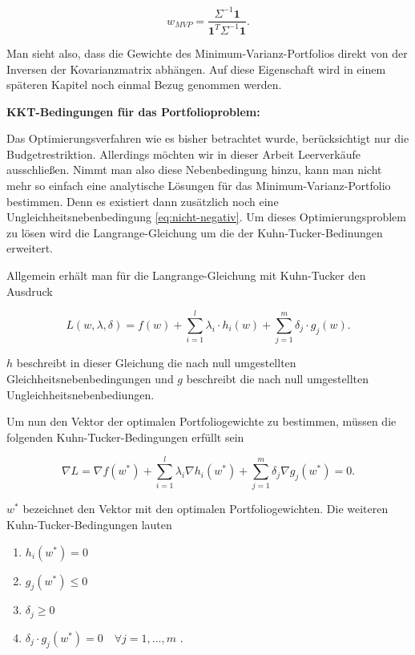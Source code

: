\documentclass[parskip=half]{scrartcl}
\begin{document}
	\begin{equation}
		w_{MVP} = \frac{\Sigma^{-1}\mathbf{1}}{\mathbf{1}^T \Sigma^{-1} \mathbf{1}} . \label{eq:w_mvp}
	\end{equation}
	
	
	Man sieht also, dass die Gewichte des Minimum-Varianz-Portfolios direkt von der Inversen der Kovarianzmatrix abhängen. Auf diese Eigenschaft wird in einem späteren Kapitel noch einmal Bezug genommen werden.
	
	\textbf{KKT-Bedingungen für das Portfolioproblem:}	
	
	Das Optimierungsverfahren wie es bisher betrachtet wurde, berücksichtigt nur die Budgetrestriktion. Allerdings möchten wir in dieser Arbeit Leerverkäufe ausschließen. Nimmt man also diese Nebenbedingung hinzu, kann man nicht mehr so einfach eine analytische Lösungen für das Minimum-Varianz-Portfolio bestimmen. Denn es existiert dann zusätzlich noch eine Ungleichheitsnebenbedingung \eqref{eq:nicht-negativ}. Um dieses Optimierungsproblem zu lösen wird die Langrange-Gleichung um die der Kuhn-Tucker-Bedinungen erweitert.
	
	Allgemein erhält man für die Langrange-Gleichung mit Kuhn-Tucker den Ausdruck \parencite[260]{Nickel}
	
	\begin{equation}
		L(w, \lambda, \delta) = f(w) + \sum_{i=1}^{l} \lambda_i \cdot h_i(w) + \sum_{j=1}^{m} \delta_j \cdot g_j(w) . \label{eq:langrange_kkt}
	\end{equation}
	
	$h$ beschreibt in dieser Gleichung die nach null umgestellten Gleichheitsnebenbedingungen und $g$ beschreibt die nach null umgestellten Ungleichheitsnebenbediungen.
	
	
	Um nun den Vektor der optimalen Portfoliogewichte zu bestimmen, müssen die folgenden Kuhn-Tucker-Bedingungen erfüllt sein \parencite[260]{Nickel}
	
	\begin{equation}
		\nabla L = \nabla f(w^*) + \sum_{i=1}^{l} \lambda_i \nabla h_i(w^*) + \sum_{j=1}^{m} \delta_j \nabla g_j (w^*) = 0 .
	\end{equation}
	
	$w^*$ bezeichnet den Vektor mit den optimalen Portfoliogewichten. Die weiteren Kuhn-Tucker-Bedingungen lauten
	
	\begin{enumerate}
		\item $h_i(w^*) = 0$
		\item $g_j(w^*) \leq 0$
		\item $\delta_j \geq 0$
		\item $\delta_j \cdot g_j(w^*) = 0 \quad \forall j=1, ..., m$ .
	\end{enumerate}
	
\end{document}
